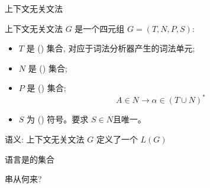 
\begin{frame}{}

  \begin{center}
    上下文无关文法
  \end{center}
\end{frame}

\begin{frame}{}
  \begin{definition}
    上下文无关文法 $G$ 是一个四元组 $G = (T, N, P, S)$:
    \vspace{0.30cm}

    \begin{itemize}
      \setlength{\itemsep}{8pt}
      \item $T$ 是 () 集合, 对应于词法分析器产生的词法单元;
      \item $N$ 是 () 集合;
      \item $P$ 是 () 集合;
        \[
          \boxed{A \in N \longrightarrow \alpha \in (T \cup N)^{\ast}}
        \]
        \vspace{-0.60cm}
      \item $S$ 为 () 符号。要求 $S \in N$且唯一。
    \end{itemize}
  \end{definition}
\end{frame}

\begin{frame}{}
  \begin{center}
    语义: 上下文无关文法 $G$ 定义了一个 $L(G)$

    \pause
    \vspace{0.50cm}
    语言是的集合

    \vspace{0.30cm}
    串从何来?
  \end{center}
\end{frame}

